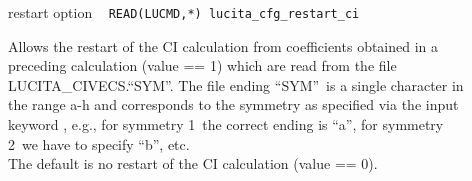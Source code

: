 \begin{description}
\item[] restart option \verb| |\newline
\verb|READ(LUCMD,*) lucita_cfg_restart_ci |

Allows the restart of the CI calculation from coefficients obtained 
in a preceding calculation (value == 1) which are read from the file LUCITA\_CIVECS.``SYM''. 
The file ending ``SYM''\ is a single character in the range a-h and 
corresponds to the symmetry as specified via the input keyword , e.g., 
for symmetry 1\ the correct ending is ``a'', for symmetry 2\ we have to specify ``b'', etc.\\
The default is no restart of the CI calculation (value == 0).
\end{description}

